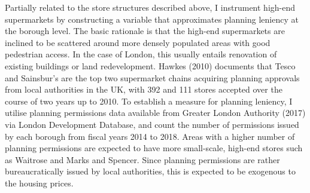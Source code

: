 \documentclass{article}
\begin{document}
Partially related to the store structures described above, I instrument high-end supermarkets by constructing a variable that approximates planning leniency at the borough level. The basic rationale is that the high-end supermarkets are inclined to be scattered around more densely populated areas with good pedestrian access. In the case of London, this usually entails renovation of existing buildings or land redevelopment. Hawkes (2010) documents that Tesco and Sainsbur's are the top two supermarket chains acquiring planning approvals from local authorities in the UK, with 392 and 111 stores accepted over the course of two years up to 2010. To establish a measure for planning leniency, I utilise planning permissions data available from Greater London Authority (2017) via London Development Database, and count the number of permissions issued by each borough from fiscal years 2014 to 2018. Areas with a higher number of planning permissions are expected to have more small-scale, high-end stores such as Waitrose and Marks and Spencer. Since planning permissions are rather bureaucratically issued by local authorities, this is expected to be exogenous to the housing prices.
\end{document}
